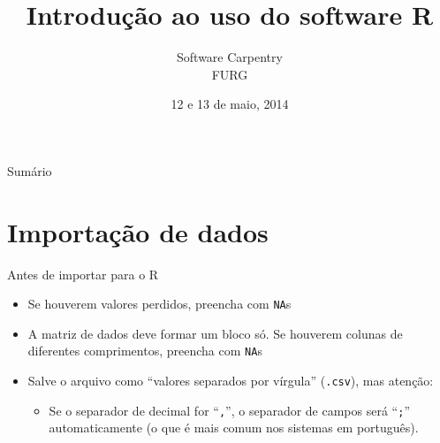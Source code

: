 \documentclass[10pt]{beamer}\usepackage[]{graphicx}\usepackage[]{color}
\title[Módulo II\\ Descritiva]{Introdução ao uso do software R}
\author{Software Carpentry\\ FURG}
\date{12 e 13 de maio, 2014}
\begin{document}
\begin{frame}
\maketitle
\end{frame}

\begin{frame}{Sumário}
\tableofcontents
\end{frame}

\section{Importação de dados}

\begin{frame}[fragile=singleslide]{Antes de importar para o R}
\begin{itemize}
\item Se houverem valores perdidos, preencha com \texttt{NA}s
\item A matriz de dados deve formar um bloco só. Se houverem colunas de
  diferentes comprimentos, preencha com \texttt{NA}s
\item Salve o arquivo como ``valores separados por vírgula''
  (\texttt{.csv}), mas atenção:
    \begin{itemize}
    \item Se o separador de decimal for ``\texttt{,}'', o separador de
      campos será ``\texttt{;}'' automaticamente (o que é mais comum nos
      sistemas em português).
    \end{itemize}
\end{itemize}
\end{frame}

\end{document}
